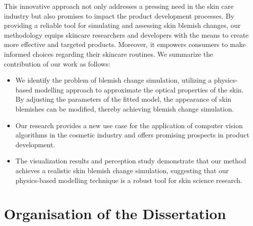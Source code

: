 \begin{spacing}{1.5}
This innovative approach not only addresses a pressing need in the skin care industry but also promises to impact the product development processes. By providing a reliable tool for simulating and assessing skin blemish changes, our methodology equips skincare researchers and developers with the means to create more effective and targeted products. Moreover, it empowers consumers to make informed choices regarding their skincare routines. We summarize the contribution of our work as follows:
\begin{itemize}
    \item We identify the problem of blemish change simulation, utilizing a physics-based modelling approach to approximate the optical properties of the skin. By adjusting the parameters of the fitted model, the appearance of skin blemishes can be modified, thereby achieving blemish change simulation.
    \item Our research provides a new use case for the application of computer vision algorithms in the cosmetic industry and offers promising prospects in product development.
    \item The visualization results and perception study demonstrate that our method achieves a realistic skin blemish change simulation, suggesting that our physics-based modelling technique is a robust tool for skin science research.
\end{itemize}

\section{Organisation of the Dissertation}


\end{spacing}
\newpage


